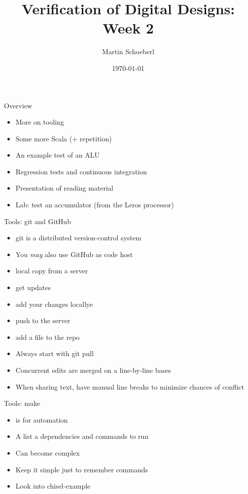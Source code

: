 

\newif\ifbook


\title{Verification of Digital Designs: Week 2}
\author{Martin Schoeberl}
\date{\today}



\begin{frame}
\titlepage
\end{frame}

\begin{frame}[fragile]{Overview}
\begin{itemize}
\item More on tooling
\item Some more Scala (+ repetition)
\item An example test of an ALU
\item Regression tests and continuous integration
\item Presentation of reading material
\item Lab: test an accumulator (from the Leros processor)
\end{itemize}
\end{frame}

\begin{frame}[fragile]{Tools: git and GitHub}
\begin{itemize}
\item git is a distributed version-control system
\item You \emph{may} also use GitHub as code host
\item {} local copy from a server
\item {} get updates
\item {} add your changes locallye
\item {} push to the server
\item {} add a file to the repo
\item Always start with git pull
\item Concurrent edits are merged on a line-by-line bases
\item When sharing text, have manual line breaks to minimize chances of conflict
\end{itemize}
\end{frame}

\begin{frame}[fragile]{Tools: make}
\begin{itemize}
\item {} is for automation
\item A list a dependencies and commands to run
\item Can become complex
\item Keep it simple just to remember commands
\item Look into chisel-example
\end{itemize}
\end{frame}

